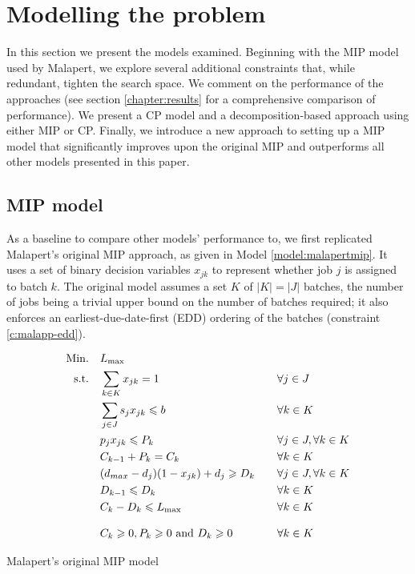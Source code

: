 \documentclass[13pt, letterpaper, oneside]{book}
\begin{document}
\chapter{Modelling the problem} 
In this section we present the models examined.
Beginning with the MIP model used by Malapert, we explore several additional
constraints that, while redundant, tighten the search space. We comment on the
performance of the approaches (see section \ref{chapter:results} for a
comprehensive comparison of performance). We present a CP model and a
decomposition-based approach using either MIP or CP. Finally, we introduce a new
approach to setting up a MIP model that significantly improves upon the original
MIP and outperforms all other models presented in this paper.

\section{MIP model}\label{sec:malapertmipmodel}
As a baseline to compare other models' performance to, we first replicated
Malapert's original MIP approach, as given in Model \ref{model:malapertmip}. It
uses a set of binary decision variables $x_{jk}$ to represent whether job $j$ is
assigned to batch $k$. The original model assumes a set $K$ of $|K| = |J|$
batches, the number of jobs being a trivial upper bound on the number of batches
required; it also enforces an earliest-due-date-first (EDD) ordering of the
batches (constraint \ref{c:malapp-edd}).

\begin{model}[h]
\begin{alignat}{2}
\mathrm{Min.}\quad & L_{\text{max}} && \\
\mathrm{s.t.}\quad &\sum_{k \in K} x_{jk} = 1 \quad && \forall j \in J \\
  &\sum_{j \in J} s_j x_{jk} \leqslant b \quad && \forall k \in K\\
  &p_j x_{jk} \leqslant P_k \quad && \forall j \in J, \forall k \in K\\
  &C_{k-1} + P_{k} = C_k \quad && \forall k \in K\\
  &(d_{max} - d_j)(1 - x_{jk}) + d_j \geqslant D_k \quad && \forall j \in J, \forall k \in K\\
  &D_{k-1} \leqslant D_k \quad && \forall k \in K \label{c:malapp-edd} \\
  &C_k - D_k \leqslant L_{\text{max}} \quad && \forall k \in K\\[2ex]
  &C_k \geqslant 0, P_k \geqslant 0 \text{ and } D_k \geqslant 0 \quad && \forall k \in K  
\end{alignat}
\caption{Malapert's original MIP model}
\label{model:malapertmip}
\end{model}
\end{document}
